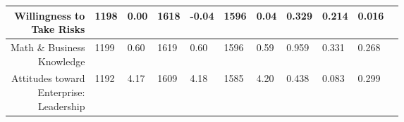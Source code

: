 \begin{longtable}{|r|l|l|l|l|l|l|l|l|l|l}
\hline

	 \makecell{Willingness to \\Take Risks}                                          & 1198                                                               &  0.00                                                              & 1618                                                               & -0.04                                                              & 1596                                                               &  0.04                                                              & 0.329                                                              & 0.214                                                              & 0.016                                                             \\

\hline

	 \makecell{Math \& Business\\ Knowledge}                                          & 1199                                                                 &  0.60                                                                & 1619                                                                 &  0.60                                                                & 1596                                                                 &  0.59                                                                & 0.959                                                                & 0.331                                                                & 0.268                                                               \\

\hline

	\makecell{ Attitudes toward\\ Enterprise:\\ Leadership}                            & 1192                                                               &  4.17                                                              & 1609                                                               &  4.18                                                              & 1585                                                               &  4.20                                                              & 0.438                                                              & 0.083                                                              & 0.299                                                             \\


\end{longtable}

